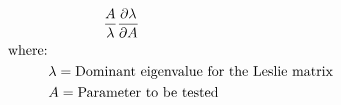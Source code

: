 \documentclass[12pt]{article}
\begin{document}
\begin{preview}
\begin{align}
\frac{A}{\lambda}\frac{\partial \lambda}{\partial A}&  \nonumber \\ 
& \hspace{-1.3in} \text{where:} \nonumber \\
& \hspace{-0.9in} \lambda = \text{Dominant eigenvalue for the Leslie matrix} \nonumber \\
& \hspace{-0.9in} A = \text{Parameter to be tested} \nonumber
\end{align}
\end{preview}
\end{document}
